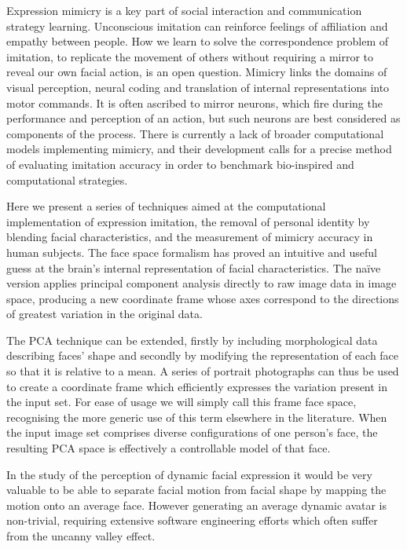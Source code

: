 \documentclass[runningheads]{llncs}
\begin{document}
Expression mimicry is a key part of social interaction\cite{bavelas2007face} and communication strategy learning\cite{oberman2007face}. Unconscious imitation can reinforce feelings of affiliation and empathy between people\cite{lakin2003using}. How we learn to solve the correspondence problem of imitation, to replicate the movement of others without requiring a mirror to reveal our own facial action, is an open question\cite{grossberg2010children,sheppard1959evolution}.  Mimicry links the domains of visual perception, neural coding and translation of internal representations into motor commands.  It is often ascribed to mirror neurons\cite{rizzolatti2004mirror}, which fire during the performance and perception of an action, but such neurons are best considered as components of the process. There is currently a lack of broader computational models implementing mimicry\cite{dinstein2008mirror}, and their development calls for a precise method of evaluating imitation accuracy in order to benchmark bio-inspired and computational strategies.


Here we present a series of techniques aimed at the computational implementation of expression imitation, the removal of personal identity by blending facial characteristics, and the measurement of mimicry accuracy in human subjects.
The face space formalism\cite{valentine2001face} has proved an intuitive and useful guess at the brain's internal representation of facial characteristics. The na\"{i}ve version\cite{turk1991face} applies principal component analysis directly to raw image data in image space, producing a new coordinate frame whose axes correspond to the directions of greatest variation in the original data.

The PCA technique can be extended, firstly by including morphological data describing faces' shape and secondly by modifying the representation of each face so that it is relative to a mean. A series of portrait photographs can thus be used to create a coordinate frame which efficiently expresses the variation present in the input set. For ease of usage we will simply call this frame face space, recognising the more generic use of this term elsewhere in the literature\cite{valentine2001face}.  When the input image set comprises diverse configurations of one person's face, the resulting PCA space is effectively a controllable model of that face.


In the study of the perception of dynamic facial expression it would be very valuable to be able to separate facial motion from facial shape by mapping the motion onto an average face. However generating an average dynamic avatar is non-trivial, requiring extensive software engineering efforts\cite{itti2003realistic,rajan2002realistic} which often suffer from the uncanny valley effect\cite{mori1970uncanny}.
\end{document}
